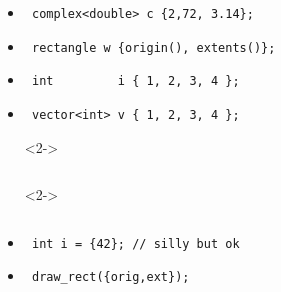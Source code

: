 \begin{frame}[fragile]
\begin{columns}[t]
\begin{itemize}
\item<2->{\scriptsize\begin{verbatim} complex<double> c {2,72, 3.14}; \end{verbatim}}
\item<2->{\scriptsize\begin{verbatim} rectangle w {origin(), extents()};\end{verbatim}}
\item<2->{\scriptsize\begin{verbatim} int         i { 1, 2, 3, 4 }; \end{verbatim}}
\item<2->{\scriptsize\begin{verbatim} vector<int> v { 1, 2, 3, 4 };  \end{verbatim}}
\item[] <2->{\scriptsize\begin{verbatim} \end{verbatim}}
\item[] <2->{\scriptsize\begin{verbatim} \end{verbatim}}
\item<3->{\scriptsize\begin{verbatim} int i = {42}; // silly but ok\end{verbatim}}
\item<4->{\scriptsize\begin{verbatim} draw_rect({orig,ext});  \end{verbatim}}
\end{itemize}

\end{columns}

\end{frame}



